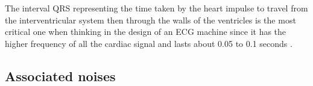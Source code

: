 The interval QRS representing the time taken by the heart impulse to travel from the interventricular system then through the walls of the ventricles is the most critical one when thinking in the design of an ECG machine since it has the higher frequency of all the cardiac signal and lasts about 0.05 to 0.1 seconds \cite{khandpur2019compendium}.

\subsection{Associated noises}

\pagebreak